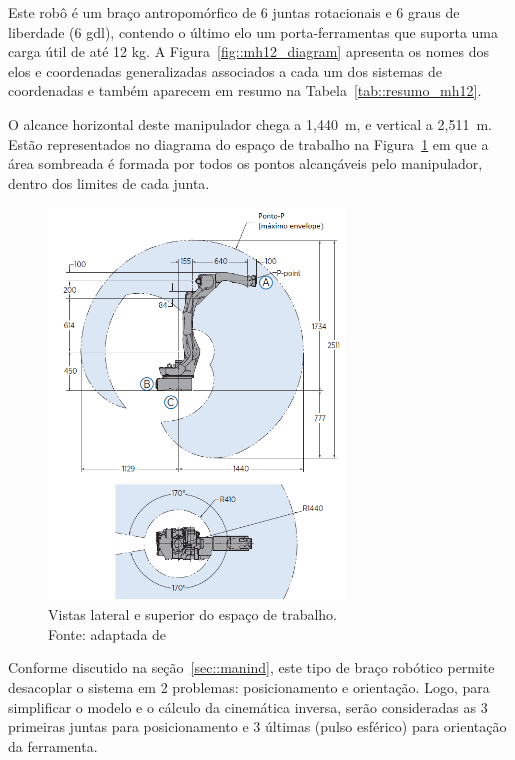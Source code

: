 Este robô é um braço antropomórfico de 6 juntas rotacionais e 6 graus de
liberdade (6 gdl), contendo o último elo um porta-ferramentas que suporta uma
carga útil de até 12 kg. A Figura~\ref{fig::mh12_diagram} apresenta os nomes dos
elos e coordenadas generalizadas associados a cada um dos sistemas de
coordenadas e também aparecem em resumo na Tabela~\ref{tab::resumo_mh12}.

O alcance horizontal deste manipulador chega a 1,440~m, e vertical a
2,511~m. Estão representados no diagrama do espaço de trabalho na
Figura~\ref{fig::workspace} em que a área sombreada é formada por todos os
pontos alcançáveis pelo manipulador, dentro dos limites de cada junta.

\begin{figure}[h]
	\centering 
 	\includegraphics[width=0.7\textwidth]{figs/workspace}
 	\caption{Vistas lateral e superior do espaço de trabalho. \\Fonte: adaptada
 	de}
 	\label{fig::workspace}
\end{figure}

Conforme discutido na seção~\ref{sec::manind}, este tipo de braço robótico
permite desacoplar o sistema em 2 problemas: posicionamento e orientação. Logo,
para simplificar o modelo e o cálculo da cinemática inversa, serão consideradas
as 3 primeiras juntas para posicionamento e 3 últimas (pulso esférico) para
orientação da ferramenta.

